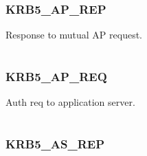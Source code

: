 \documentclass[letterpaper,10pt,english]{sphinxmanual}
\begin{document}
\subsubsection{KRB5\_AP\_REP}
\label{appdev/refs/macros/KRB5_AP_REP:krb5-ap-rep}\label{appdev/refs/macros/KRB5_AP_REP::doc}\label{appdev/refs/macros/KRB5_AP_REP:krb5-ap-rep-data}

\begin{fulllineitems}
\label{appdev/refs/macros/KRB5_AP_REP:KRB5_AP_REP}
\end{fulllineitems}


Response to mutual AP request.

\begin{tabulary}{\linewidth}{|L|L|}
\hline

 & 
\\
\hline\end{tabulary}



\subsubsection{KRB5\_AP\_REQ}
\label{appdev/refs/macros/KRB5_AP_REQ:krb5-ap-req}\label{appdev/refs/macros/KRB5_AP_REQ::doc}\label{appdev/refs/macros/KRB5_AP_REQ:krb5-ap-req-data}

\begin{fulllineitems}
\label{appdev/refs/macros/KRB5_AP_REQ:KRB5_AP_REQ}
\end{fulllineitems}


Auth req to application server.

\begin{tabulary}{\linewidth}{|L|L|}
\hline

 & 
\\
\hline\end{tabulary}



\subsubsection{KRB5\_AS\_REP}
\label{appdev/refs/macros/KRB5_AS_REP:krb5-as-rep}\label{appdev/refs/macros/KRB5_AS_REP:krb5-as-rep-data}\label{appdev/refs/macros/KRB5_AS_REP::doc}
\end{document}
